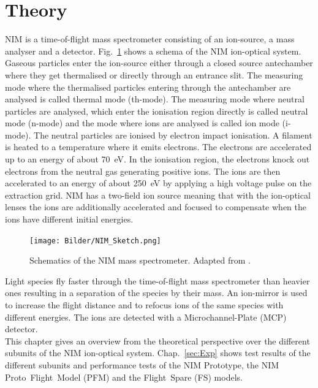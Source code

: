 \section{Theory} \label{sec:theory}

	NIM is a time-of-flight mass spectrometer consisting of an ion-source, a mass analyser and a detector. Fig.~\ref{fig:NIMSketch} shows a schema of the NIM ion-optical system. Gaseous particles enter the ion-source either through a closed source antechamber where they get thermalised or directly through an entrance slit. The measuring mode where the thermalised particles entering through the antechamber are analysed is called thermal mode (th-mode). The measuring mode where neutral particles are analysed, which enter the ionisation region directly is called neutral mode (n-mode) and the mode where ions are analysed is called ion mode (i-mode). The neutral particles are ionised by electron impact ionisation. A filament is heated to a temperature where it emits electrons. The electrons are accelerated up to an energy of about 70~eV. In the ionisation region, the electrons knock out electrons from the neutral gas generating positive ions. The ions are then accelerated to an energy of about 250~eV by applying a high voltage pulse on the extraction grid. NIM has a two-field ion source meaning that with the ion-optical lenses the ions are additionally accelerated and focused to compensate when the ions have different initial energies.
	\begin{figure}[h!]
		\centering
		\texttt{[image: Bilder/NIM\_Sketch.png]}
		\caption{Schematics of the NIM mass spectrometer. Adapted from \cite{Diss_Meyer}.}
		\label{fig:NIMSketch}
	\end{figure}
	Light species fly faster through the time-of-flight mass spectrometer than heavier ones resulting in a separation of the species by their mass. An ion-mirror is used to increase the flight distance and to refocus ions of the same species with different energies. The ions are detected with a Microchannel-Plate (MCP) detector.\\
	This chapter gives an overview from the theoretical perspective over the different subunits of the NIM ion-optical system.	Chap.~\ref{sec:Exp} shows test results of the different subunits and performance tests of the NIM Prototype, the NIM Proto~Flight~Model (PFM) and the Flight~Spare (FS) models.
		
